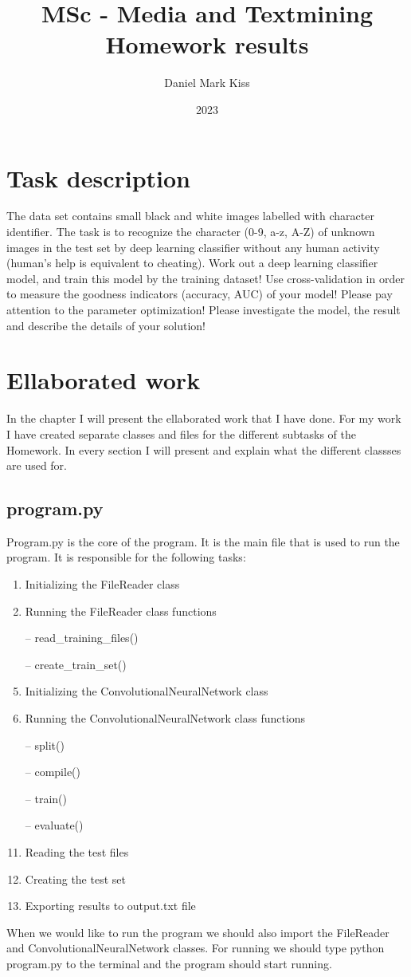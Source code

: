 \documentclass[11pt,a4paper,oneside]{report}
\title{\Huge{MSc - Media and Textmining}\\Homework results}
\author{\huge{Daniel Mark Kiss}}
\date{2023}
\begin{document}
\maketitle
\newpage
\tableofcontents
\pagebreak

\chapter{Task description}

The data set contains small black and white images labelled with character identifier. The task is to recognize the character (0-9, a-z, A-Z) of unknown images in the test set by deep learning classifier without any human activity (human’s help is equivalent to cheating).
Work out a deep learning classifier model, and train this model by the training dataset! Use cross-validation in order to measure the goodness indicators (accuracy, AUC) of your model! Please pay attention to the parameter optimization! Please investigate the model, the result and describe the details of your solution!

\chapter{Ellaborated work}
In the chapter I will present the ellaborated work that I have done.
For my work I have created separate classes and files for the different subtasks of the Homework.
In every section I will present and explain what the different classses are used for.
\section{program.py}

Program.py is the core of the program. It is the main file that is used to run the program. It is responsible for the following tasks:
\begin{enumerate}
  \item Initializing the FileReader class
  \item Running the FileReader class functions
  \item[--] read\_training\_files()
  \item[--] create\_train\_set()
  \item Initializing the ConvolutionalNeuralNetwork class
  \item Running the ConvolutionalNeuralNetwork class functions
  \item[--]split()
  \item[--] compile()
  \item[--] train()
  \item[--] evaluate()
  \item Reading the test files
  \item Creating the test set
  \item Exporting results to output.txt file
\end{enumerate}
When we would like to run the program we should also import the FileReader and ConvolutionalNeuralNetwork classes.
For running we should type python program.py to the terminal and the program should start running.
\end{document}
